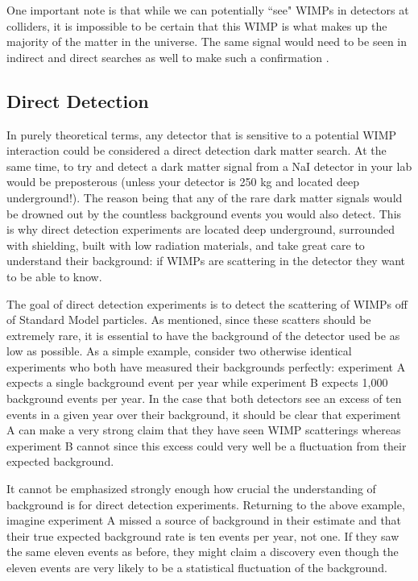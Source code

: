 One important note is that while we can potentially ``see" WIMPs in detectors at colliders,  it is impossible to be certain that this WIMP is what makes up the majority of the matter in the universe.  The same signal would need to be seen in indirect and direct searches as well to make such a confirmation \cite{queiroz2016dark}.


\subsection{Direct Detection}
\label{sec:dm_direct_detection}

In purely theoretical terms, any detector that is sensitive to a potential WIMP interaction could be considered a direct detection dark matter search.  At the same time, to try and detect a dark matter signal from a NaI detector in your lab would be preposterous (unless your detector is 250 kg and located deep underground!).  The reason being that any of the rare dark matter signals would be drowned out by the countless background events you would also detect.  This is why direct detection experiments are located deep underground, surrounded with shielding, built with low radiation materials, and take great care to understand their background: if WIMPs are scattering in the detector they want to be able to know.

The goal of direct detection experiments is to detect the scattering of WIMPs off of Standard Model particles.  As mentioned, since these scatters should be extremely rare, it is essential to have the background of the detector used be as low as possible.  As a simple example, consider two otherwise identical experiments who both have measured their backgrounds perfectly: experiment A expects a single background event per year while experiment B expects 1,000 background events per year.  In the case that both detectors see an excess of ten events in a given year over their background, it should be clear that experiment A can make a very strong claim that they have seen WIMP scatterings whereas experiment B cannot since this excess could very well be a fluctuation from their expected background.

It cannot be emphasized strongly enough how crucial the understanding of background is for direct detection experiments.  Returning to the above example, imagine experiment A missed a source of background in their estimate and that their true expected background rate is ten events per year, not one.  If they saw the same eleven events as before, they might claim a discovery even though the eleven events are very likely to be a statistical fluctuation of the background.


